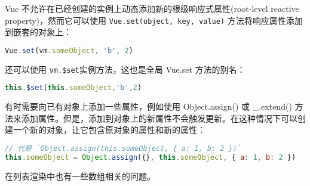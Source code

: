 Vue 不允许在已经创建的实例上动态添加新的根级响应式属性(root-level reactive property)，然而它可以使用 \texttt{Vue.set(object, key, value)} 方法将响应属性添加到嵌套的对象上：



\begin{lstlisting}[language=JavaScript]
Vue.set(vm.someObject, 'b', 2)
\end{lstlisting}

还可以使用 \texttt{vm.\$set}实例方法，这也是全局 Vue.set 方法的别名：



\begin{lstlisting}[language=JavaScript]
this.$set(this.someObject,'b',2)
\end{lstlisting}

有时需要向已有对象上添加一些属性，例如使用 Object.assign() 或 \_.extend() 方法来添加属性。但是，添加到对象上的新属性不会触发更新。在这种情况下可以创建一个新的对象，让它包含原对象的属性和新的属性：

\begin{lstlisting}[language=JavaScript]
// 代替 `Object.assign(this.someObject, { a: 1, b: 2 })`
this.someObject = Object.assign({}, this.someObject, { a: 1, b: 2 })
\end{lstlisting}


在列表渲染中也有一些数组相关的问题。




\begin{lstlisting}[language=JavaScript]

\end{lstlisting}



\begin{lstlisting}[language=JavaScript]

\end{lstlisting}






\begin{lstlisting}[language=JavaScript]

\end{lstlisting}



\begin{lstlisting}[language=JavaScript]

\end{lstlisting}






\begin{lstlisting}[language=JavaScript]

\end{lstlisting}



\begin{lstlisting}[language=JavaScript]

\end{lstlisting}


